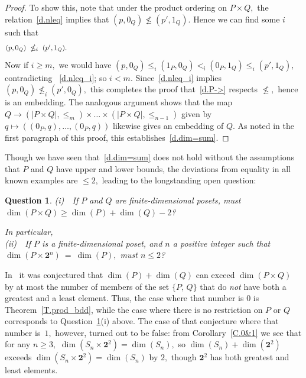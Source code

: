 \documentclass{amsart}
\newtheorem{question}[theorem]{Question}
\numberwithin{equation}{section}
\numberwithin{theorem}{section}
\newcommand{\2}{\mathbf{2}}
\begin{document}
\begin{proof}
To show this, note that under the product ordering on $P\times Q,$
the relation~\eqref{d.nleq} implies that $(p,0_Q)\nleq (p',1_Q).$
Hence we can find some $i$ such that
%
\begin{equation}\begin{minipage}[c]{35pc}\label{d.nleq_i}
$(p,0_Q)\ \nleq_i\ (p',1_Q).$
\end{minipage}\end{equation}
%
Now if $i\geq m,$ we would have
$(p,0_Q)\leq_i (1_P,0_Q) <_i (0_P,1_Q) \leq_i (p',1_Q),$
contradicting ~\eqref{d.nleq_i}; so $i< m.$
Since~\eqref{d.nleq_i} implies $(p,0_Q)\nleq_i (p',0_Q),$
this completes the proof that~\eqref{d.P->} respects $\nleq,$
hence is an embedding.
The analogous argument shows that the map
$Q\to {(|P\times Q|,\leq_m)\times\dots\times(|P\times Q|,\leq_{n-1})}$
given by $q\mapsto ((0_P,q),\dots,(0_P,q))$ likewise
gives an embedding of $Q.$
As noted in the first paragraph of this
proof, this establishes~\eqref{d.dim=sum}.
\end{proof}

Though we have seen that~\eqref{d.dim=sum}
does not hold without the assumptions
that $P$ and $Q$ have upper and lower bounds, the deviations
from equality in all known examples are $\leq 2,$
leading to the longstanding open question:

\begin{question}\label{Q.bound_2}
\textup{(i)}\ \ If $P$ and $Q$ are finite-dimensional posets,
must $\dim(P\times Q)\geq \dim(P)+\dim(Q)-2$?

In particular,\\
%
\textup{(ii)}\ \ If $P$ is a finite-dimensional poset, and $n$
a positive integer such that $\dim(P\times \2^n)\ =\ \dim(P),$
must $n\leq 2$?
\end{question}

In~\cite[last line of p.179 and top line of p.180]{K+T}
it was conjectured that $\dim(P)+\dim(Q)$ can exceed $\dim(P\times Q)$
by at most the number of members
of the set $\{P,\,Q\}$ that do {\em not} have both a
greatest and a least element.
Thus, the case where that number is $0$ is
Theorem~\ref{T.prod_bdd}, while the case where there is no restriction
on $P$ or $Q$ corresponds to Question~\ref{Q.bound_2}(i) above.
The case of that conjecture
where that number is~$1,$ however, turned out to
be false: from Corollary~\ref{C.0&1} we see that
for any $n\geq 3,$ $\dim(S_n\times \2^2)=\dim(S_n),$
so $\dim(S_n)+\dim(\2^2)$ exceeds
$\dim(S_n\times \2^2)=\dim(S_n)$ by $2,$
though $\2^2$ has both greatest and least elements.
\end{document}
